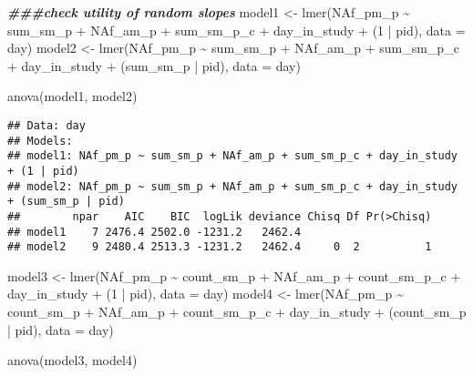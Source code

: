 \documentclass[
]{article}
\newenvironment{Shaded}{\begin{snugshade}}{\end{snugshade}}
\newcommand{\AttributeTok}[1]{\textcolor[rgb]{0.77,0.63,0.00}{#1}}
\newcommand{\DecValTok}[1]{\textcolor[rgb]{0.00,0.00,0.81}{#1}}
\newcommand{\DocumentationTok}[1]{\textcolor[rgb]{0.56,0.35,0.01}{\textbf{\textit{#1}}}}
\newcommand{\FunctionTok}[1]{\textcolor[rgb]{0.00,0.00,0.00}{#1}}
\newcommand{\NormalTok}[1]{#1}
\newcommand{\OtherTok}[1]{\textcolor[rgb]{0.56,0.35,0.01}{#1}}
\newcommand{\SpecialCharTok}[1]{\textcolor[rgb]{0.00,0.00,0.00}{#1}}
\begin{document}
\begin{Shaded}
\begin{Highlighting}[]
\DocumentationTok{\#\#\#check utility of random slopes}
\NormalTok{model1 }\OtherTok{\textless{}{-}} \FunctionTok{lmer}\NormalTok{(NAf\_pm\_p }\SpecialCharTok{\textasciitilde{}}\NormalTok{ sum\_sm\_p }\SpecialCharTok{+}\NormalTok{ NAf\_am\_p }\SpecialCharTok{+}\NormalTok{ sum\_sm\_p\_c }\SpecialCharTok{+}\NormalTok{ day\_in\_study }\SpecialCharTok{+}\NormalTok{ (}\DecValTok{1} \SpecialCharTok{|}\NormalTok{ pid), }\AttributeTok{data =}\NormalTok{ day)}
\NormalTok{model2 }\OtherTok{\textless{}{-}} \FunctionTok{lmer}\NormalTok{(NAf\_pm\_p }\SpecialCharTok{\textasciitilde{}}\NormalTok{ sum\_sm\_p }\SpecialCharTok{+}\NormalTok{ NAf\_am\_p }\SpecialCharTok{+}\NormalTok{ sum\_sm\_p\_c }\SpecialCharTok{+}\NormalTok{ day\_in\_study }\SpecialCharTok{+}\NormalTok{ (sum\_sm\_p }\SpecialCharTok{|}\NormalTok{ pid), }\AttributeTok{data =}\NormalTok{ day)}

\FunctionTok{anova}\NormalTok{(model1, model2)}
\end{Highlighting}
\end{Shaded}

\begin{verbatim}
## Data: day
## Models:
## model1: NAf_pm_p ~ sum_sm_p + NAf_am_p + sum_sm_p_c + day_in_study + (1 | pid)
## model2: NAf_pm_p ~ sum_sm_p + NAf_am_p + sum_sm_p_c + day_in_study + (sum_sm_p | pid)
##        npar    AIC    BIC  logLik deviance Chisq Df Pr(>Chisq)
## model1    7 2476.4 2502.0 -1231.2   2462.4                    
## model2    9 2480.4 2513.3 -1231.2   2462.4     0  2          1
\end{verbatim}

\begin{Shaded}
\begin{Highlighting}[]
\NormalTok{model3 }\OtherTok{\textless{}{-}} \FunctionTok{lmer}\NormalTok{(NAf\_pm\_p }\SpecialCharTok{\textasciitilde{}}\NormalTok{ count\_sm\_p }\SpecialCharTok{+}\NormalTok{ NAf\_am\_p }\SpecialCharTok{+}\NormalTok{ count\_sm\_p\_c }\SpecialCharTok{+}\NormalTok{ day\_in\_study }\SpecialCharTok{+}\NormalTok{ (}\DecValTok{1} \SpecialCharTok{|}\NormalTok{ pid), }\AttributeTok{data =}\NormalTok{ day)}
\NormalTok{model4 }\OtherTok{\textless{}{-}} \FunctionTok{lmer}\NormalTok{(NAf\_pm\_p }\SpecialCharTok{\textasciitilde{}}\NormalTok{ count\_sm\_p }\SpecialCharTok{+}\NormalTok{ NAf\_am\_p }\SpecialCharTok{+}\NormalTok{ count\_sm\_p\_c }\SpecialCharTok{+}\NormalTok{ day\_in\_study }\SpecialCharTok{+}\NormalTok{ (count\_sm\_p }\SpecialCharTok{|}\NormalTok{ pid), }\AttributeTok{data =}\NormalTok{ day)}

\FunctionTok{anova}\NormalTok{(model3, model4)}
\end{Highlighting}
\end{Shaded}
\end{document}
